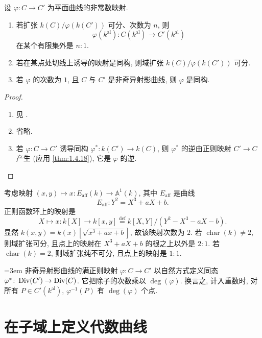\begin{proposition} \label{thm:1.4.24} 
设 $\varphi\colon C\to C'$ 为平面曲线的非常数映射.
\begin{enumerate}[label=\textup{(\alph*)}]
\item 若扩张 $k(C)/\varphi(k(C'))$ 可分、次数为 $n$, 则
\[
\varphi(k^{\mathrm{al}})\colon C(k^{\mathrm{al}})\to C'(k^{\mathrm{al}})
\]
在某个有限集外是 $n:1$.
\item 若在某点处切线上诱导的映射是同构, 则域扩张 $k(C)/\varphi(k(C'))$ 可分.
\item 若 $\varphi$ 的次数为 $1$, 且 $C$ 与 $C'$ 是非奇异射影曲线, 则 $\varphi$ 是同构.
\end{enumerate}
\end{proposition}

\begin{proof}
\begin{enumerate}[label=\textup{(\alph*)}]
\item 见 \cite[\S8.6, Problem 8.36]{fulton1969}.
\item 省略.
\item 若 $\varphi\colon C\to C'$ 诱导同构 $\varphi^*\colon k(C')\to k(C)$, 则 $\varphi^*$ 的逆由正则映射 $C'\to C$ 产生 (应用 \ref{thm:1.4.18}), 它是 $\varphi$ 的逆.
\end{enumerate}
\end{proof}

\begin{example} \label{thm:1.4.25} 
考虑映射 $(x,y)\mapsto x\colon E_{\mathrm{aff}}(k)\to\mathbb{A}^1(k)$, 其中 $E_{\mathrm{aff}}$ 是曲线
\[
E_{\mathrm{aff}}\colon Y^2 = X^3 + aX + b.
\]
正则函数环上的映射是
\[
X\mapsto x\colon k[X]\to k[x,y] \overset{\text{def}}{=} k[X,Y]/(Y^2 - X^3 - aX - b).
\]
显然 $k(x,y) = k(x)[\sqrt{x^3 + ax + b}]$, 故该映射次数为 $2$. 若 $\operatorname{char}(k)\neq 2$, 则域扩张可分, 且点上的映射在 $X^3 + aX + b$ 的根之上以外是 $2:1$. 若 $\operatorname{char}(k) = 2$, 则域扩张纯不可分, 且点上的映射是 $1:1$.
\end{example}

\begin{remark} \label{thm:1.4.26} 
{\emergencystretch=3em 非奇异射影曲线的满正则映射 $\varphi\colon C\to C'$ 以自然方式定义同态 $\varphi^*\colon\operatorname{Div}(C')\to\operatorname{Div}(C)$. 它把除子的次数乘以 $\deg(\varphi)$. 换言之, 计入重数时, 对所有 $P\in C'(k^{\mathrm{al}})$, $\varphi^{-1}(P)$ 有 $\deg(\varphi)$ 个点.\par}
\end{remark}

\section{在子域上定义代数曲线}\label{sec:1.5}

